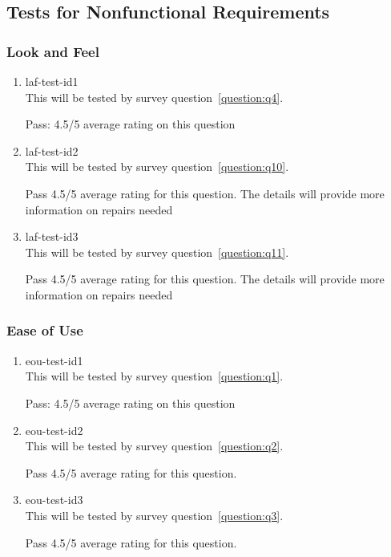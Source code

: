 \documentclass[12pt, titlepage]{article}
\begin{document}
\subsection{Tests for Nonfunctional Requirements}

\subsubsection{Look and Feel} \label{LookAndFeel}

\begin{enumerate}

\item{laf-test-id1\\}
This will be tested by survey question~\ref{question:q4}.

Pass: 4.5/5 average rating on this question
\item{laf-test-id2\\}
This will be tested by survey question~\ref{question:q10}.

Pass 4.5/5 average rating for this question. The details will provide more
information on repairs needed
\item{laf-test-id3\\}
This will be tested by survey question~\ref{question:q11}.

Pass 4.5/5 average rating for this question. The details will provide more
information on repairs needed
\end{enumerate}

\subsubsection{Ease of Use}

\begin{enumerate}

\item{eou-test-id1\\}
This will be tested by survey question~\ref{question:q1}.

Pass: 4.5/5 average rating on this question
\item{eou-test-id2\\}
This will be tested by survey question~\ref{question:q2}.

Pass 4.5/5 average rating for this question.
\item{eou-test-id3\\}
This will be tested by survey question~\ref{question:q3}.

Pass 4.5/5 average rating for this question.
\end{enumerate}
\end{document}
